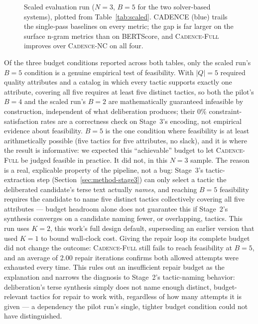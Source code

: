 \documentclass[preprint,12pt,authoryear]{elsarticle}
\newcommand{\sysNC}{\textsc{Cadence-NC}}
\newcommand{\sysFull}{\textsc{Cadence-Full}}
\renewcommand{\_}{\textunderscore\allowbreak{}}
\begin{document}
\begin{figure}[!htbp]
\centering
{}
\caption{Scaled evaluation run ($N=3$, $B=5$ for the two solver-based systems), plotted from Table~\ref{tab:scaled}. CADENCE (blue) trails the single-pass baselines on every metric; the gap is far larger on the surface n-gram metrics than on BERTScore, and \sysFull{} improves over \sysNC{} on all four.\label{fig:results}}
\end{figure}
\FloatBarrier

Of the three budget conditions reported across both tables, only the scaled run's $B=5$ condition is a genuine empirical test of feasibility. With $|Q|=5$ required quality attributes and a catalog in which every tactic supports exactly one attribute, covering all five requires at least five distinct tactics, so both the pilot's $B=4$ and the scaled run's $B=2$ are mathematically guaranteed infeasible by construction, independent of what deliberation produces; their 0\% constraint-satisfaction rates are a correctness check on Stage~3's encoding, not empirical evidence about feasibility. $B=5$ is the one condition where feasibility is at least arithmetically possible (five tactics for five attributes, no slack), and it is where the result is informative: we expected this ``achievable'' budget to let \sysFull{} be judged feasible in practice. It did not, in this $N=3$ sample. The reason is a real, explicable property of the pipeline, not a bug: Stage~3's tactic-extraction step (Section~\ref{sec:method-stage3}) can only select a tactic the deliberated candidate's terse text actually \emph{names}, and reaching $B=5$ feasibility requires the candidate to name five distinct tactics collectively covering all five attributes --- budget headroom alone does not guarantee this if Stage~2's synthesis converges on a candidate naming fewer, or overlapping, tactics. This run uses $K=2$, this work's full design default, superseding an earlier version that used $K=1$ to bound wall-clock cost. Giving the repair loop its complete budget did not change the outcome: \sysFull{} still fails to reach feasibility at $B=5$, and an average of 2.00 repair iterations confirms both allowed attempts were exhausted every time. This rules out an insufficient repair budget as the explanation and narrows the diagnosis to Stage~2's tactic-naming behavior: deliberation's terse synthesis simply does not name enough distinct, budget-relevant tactics for repair to work with, regardless of how many attempts it is given --- a dependency the pilot run's single, tighter budget condition could not have distinguished.
\end{document}
